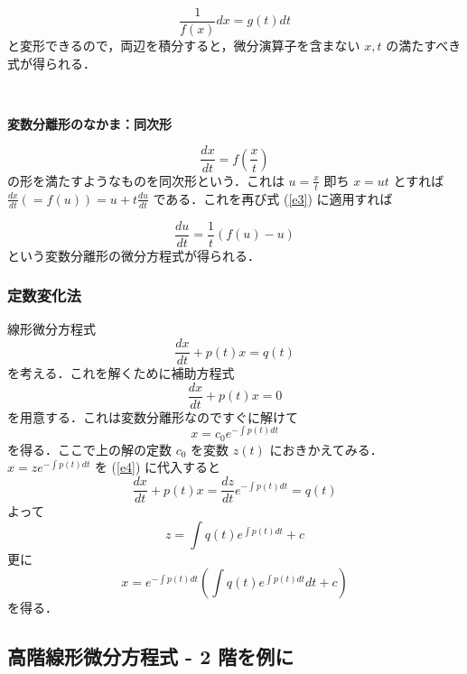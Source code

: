 \documentclass[dvipdfmx, a4paper]{jsarticle}
\begin{document}
\begin{equation}
    \frac{1}{f(x)}dx=g(t)dt
\end{equation}
と変形できるので，両辺を積分すると，微分演算子を含まない $x, t$ の満たすべき式が得られる．

　

\noindent
\textbf{変数分離形のなかま：同次形}

\begin{equation}
    \label{e3}
    \frac{dx}{dt}=f\left(\frac{x}{t}\right)
\end{equation}
の形を満たすようなものを同次形という．これは $u=\frac{x}{t}$ 即ち $x=ut$ とすれば $\frac{dx}{dt}(=f(u))=u+t\frac{du}{dt}$ である．これを再び式 (\ref{e3}) に適用すれば

\begin{equation}
    \frac{du}{dt}=\frac{1}{t}\left(f(u)-u\right)
\end{equation}
という変数分離形の微分方程式が得られる．

\subsubsection{定数変化法}

線形微分方程式
\begin{equation}
    \label{e4}
    \frac{dx}{dt}+p(t)x=q(t)
\end{equation}
を考える．これを解くために補助方程式
\begin{equation}
    \frac{dx}{dt}+p(t)x=0
\end{equation}
を用意する．これは変数分離形なのですぐに解けて
\begin{equation}
    x=c_0e^{-\int p(t)dt}
\end{equation}
を得る．ここで上の解の定数 $c_0$ を変数 $z(t)$ におきかえてみる．$x=ze^{-\int p(t)dt}$ を (\ref{e4}) に代入すると
\begin{equation}
    \frac{dx}{dt}+p(t)x=\frac{dz}{dt}e^{-\int p(t)dt}=q(t)
\end{equation}
よって
\begin{equation}
    z=\int q(t)e^{\int p(t)dt}+c
\end{equation}
更に
\begin{equation}
    x=e^{-\int p(t)dt}\left(\int q(t)e^{\int p(t)dt}dt+c\right)
\end{equation}
を得る．

\subsection{高階線形微分方程式 -  2 階を例に}
\end{document}
